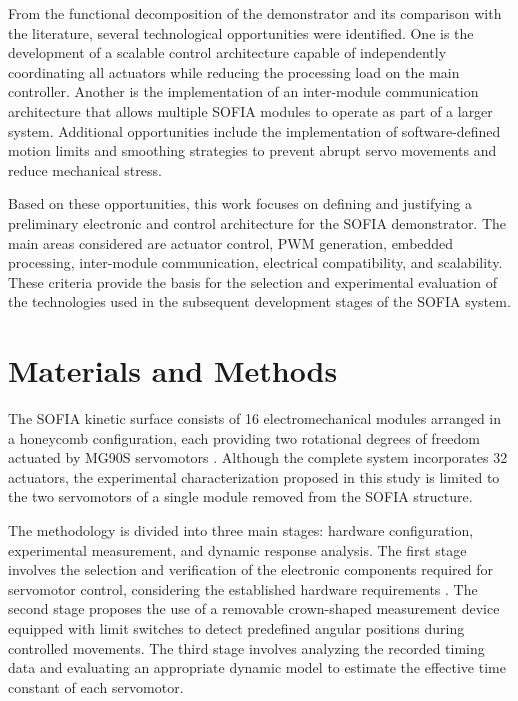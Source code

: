 \documentclass[lettersize,journal]{IEEEtran}
\begin{document}
	From the functional decomposition of the demonstrator and its comparison with
	the literature, several technological opportunities were identified. One is
	the development of a scalable control architecture capable of independently
	coordinating all actuators while reducing the processing load on the main
	controller. Another is the implementation of an inter-module communication
	architecture that allows multiple SOFIA modules to operate as part of a larger
	system. Additional opportunities include the implementation of
	software-defined motion limits and smoothing strategies to prevent abrupt
	servo movements and reduce mechanical stress.
	
	Based on these opportunities, this work focuses on defining and justifying a
	preliminary electronic and control architecture for the SOFIA demonstrator.
	The main areas considered are actuator control, PWM generation, embedded
	processing, inter-module communication, electrical compatibility, and
	scalability. These criteria provide the basis for the selection and
	experimental evaluation of the technologies used in the subsequent development
	stages of the SOFIA system.
	
	
	\section{Materials and Methods}
	\label{sec:methods}
	
	The SOFIA kinetic surface consists of 16 electromechanical modules arranged in a honeycomb configuration, each providing two rotational degrees of freedom actuated by MG90S servomotors \cite{sofia_architecture,mg90s}. Although the complete system incorporates 32 actuators, the experimental characterization proposed in this study is limited to the two servomotors of a single module removed from the SOFIA structure.
	
	The methodology is divided into three main stages: hardware configuration, experimental measurement, and dynamic response analysis. The first stage involves the selection and verification of the electronic components required for servomotor control, considering the established hardware requirements \cite{technical_session}. The second stage proposes the use of a removable crown-shaped measurement device equipped with limit switches to detect predefined angular positions during controlled movements. The third stage involves analyzing the recorded timing data and evaluating an appropriate dynamic model to estimate the effective time constant of each servomotor.
	
\end{document}
